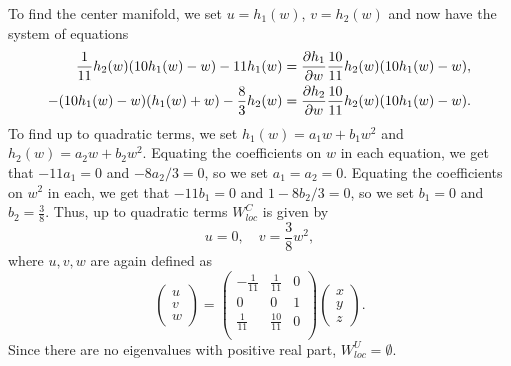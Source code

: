 \documentclass{article}
\begin{document}
To find the center manifold, we set $u=h_1(w)$, $v=h_2(w)$ and now have the system of equations
\begin{align*}
\frac{1}{11}h_2(w)(10h_1(w)-w)-11h_1(w)=\frac{\partial h_1}{\partial w}\frac{10}{11}h_2(w)(10h_1(w)-w),\\
-(10h_1(w)-w)(h_1(w)+w)-\frac{8}{3}h_2(w)=\frac{\partial h_2}{\partial w}\frac{10}{11}h_2(w)(10h_1(w)-w).
\end{align*}
To find up to quadratic terms, we set $h_1(w)=a_1w+b_1w^2$ and $h_2(w)=a_2w+b_2w^2$. 
Equating the coefficients on $w$ in each equation, we get that $-11a_1=0$ and $-8a_2/3=0$, so we set $a_1=a_2=0$. Equating the coefficients on $w^2$ in each, we get that $-11b_1=0$ and $1-8b_2/3=0$, so we set $b_1=0$ and $b_2=\frac{3}{8}$. Thus, up to quadratic terms $W^C_{loc}$ is given by
\[
u=0,\quad v=\frac{3}{8}w^2,
\]
where $u,v,w$ are again defined as 
\[
\begin{pmatrix}
	u\\v\\w
\end{pmatrix}=\left(
\begin{array}{ccc}
	-\frac{1}{11} & \frac{1}{11} & 0 \\
	0 & 0 & 1 \\
	\frac{1}{11} & \frac{10}{11} & 0 \\
\end{array}
\right)\begin{pmatrix}
	x\\y\\z
\end{pmatrix}.
\]
Since there are no eigenvalues with positive real part, $W^U_{loc}=\emptyset$.
\end{document}
